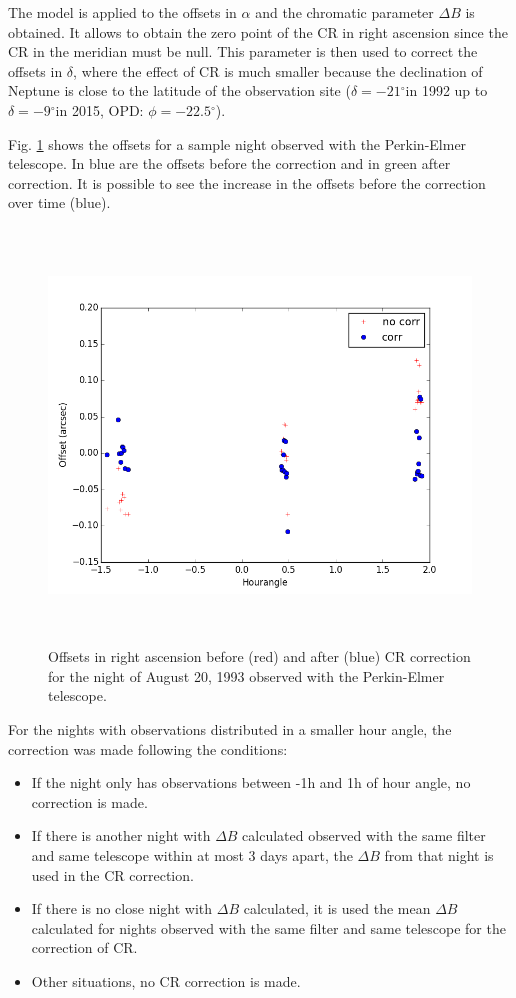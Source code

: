 \documentclass[12pt,a4paper]{report}
\newcommand{\degr}{\ensuremath{^{\circ}}}%
\begin{document}
The model is applied to the offsets in $\alpha$ and the chromatic parameter $\Delta B$ is obtained. It allows to obtain the zero point of the CR in right ascension since the CR in the meridian must be null. This parameter is then used to correct the offsets in $\delta$, where the effect of CR is much smaller because the declination of Neptune is close to the latitude of the observation site ($\delta = -21$\degr in 1992 up to $\delta = -9$\degr in 2015, OPD: $\phi = -22.5$\degr).

Fig. \ref{Fig:refraction-sample-neptune} shows the offsets for a sample night observed with the Perkin-Elmer telescope. In blue are the offsets before the correction and in green after correction. It is possible to see the increase in the offsets before the correction over time (blue).

\begin{figure}[H]
\centering
\includegraphics[height=11.0cm]{Netuno_160_1993-08-20.png} 
\caption{Offsets in right ascension before (red) and after (blue) CR correction for the night of August 20, 1993 observed with the Perkin-Elmer telescope.}
\label{Fig:refraction-sample-neptune}
\end{figure}

For the nights with observations distributed in a smaller hour angle, the correction was made following the conditions:

\begin{itemize}
\item If the night only has observations between -1h and 1h of hour angle, no correction is made.
\item If there is another night with $\Delta B$ calculated observed with the same filter and same telescope within at most 3 days apart, the $\Delta B$ from that night is used in the CR correction.
\item If there is no close night with $\Delta B$ calculated, it is used the mean $\Delta B$ calculated for nights observed with the same filter and same telescope for the correction of CR.
\item Other situations, no CR correction is made.
\end{itemize}
\end{document}
